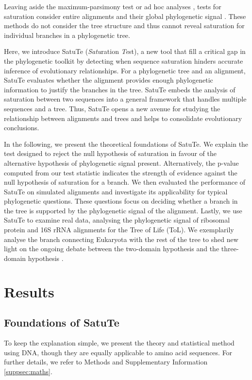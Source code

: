Leaving aside the maximum-parsimony test   or ad hoc analyses , tests for saturation consider entire alignments and their global phylogenetic signal . These methods do not consider the tree structure and thus cannot reveal saturation for individual branches in a phylogenetic tree.

\medskip

Here, we introduce SatuTe (\textit{Satu}ration \textit{Te}st), a new tool that fill a critical gap in the phylogenetic toolkit by detecting when sequence saturation hinders accurate inference of evolutionary relationships. For a phylogenetic tree and an alignment, SatuTe evaluates whether the alignment provides enough phylogenetic information to justify the branches in the tree. SatuTe embeds the analysis of saturation between two sequences into a general framework that handles multiple sequences and a tree. Thus, SatuTe opens a new avenue for studying the relationship between alignments and trees and helps to consolidate evolutionary conclusions.

\medskip

In the following, we present the theoretical foundations of SatuTe. We explain the test designed to reject the null hypothesis of saturation in favour of the alternative hypothesis of phylogenetic signal present. Alternatively, the p-value computed from our test statistic indicates the strength of evidence against the null hypothesis of saturation for a branch. We then       evaluated the performance of SatuTe on simulated alignments and investigate its applicability for typical phylogenetic questions. These questions focus on deciding whether a branch in the tree is supported by the phylogenetic signal of the alignment. Lastly, we use SatuTe to examine real data, analysing the phylogenetic signal of ribosomal protein and 16S rRNA alignments for the Tree of Life (ToL). We exemplarily analyse the branch connecting Eukaryota with the rest of the tree to shed new light on the ongoing debate between the two-domain hypothesis   and the three-domain hypothesis .

\section*{Results}
\subsection*{Foundations of SatuTe}\label{sec:SatuTe}
To keep the explanation simple, we present the 
theory and statistical method using DNA, though they are equally applicable to amino acid sequences.
For further details, we refer to Methods
 and Supplementary Information \ref{suppsec:maths}.

